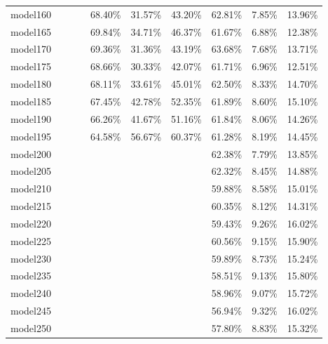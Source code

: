 \begin{longtable}{@{}llllllllll@{}}
model160 &         &         &         & 68.40\%  & 31.57\% & 43.20\% & 62.81\%  & 7.85\%  & 13.96\% \\
model165 &         &         &         & 69.84\%  & 34.71\% & 46.37\% & 61.67\%  & 6.88\%  & 12.38\% \\
model170 &         &         &         & 69.36\%  & 31.36\% & 43.19\% & 63.68\%  & 7.68\%  & 13.71\% \\
model175 &         &         &         & 68.66\%  & 30.33\% & 42.07\% & 61.71\%  & 6.96\%  & 12.51\% \\
model180 &         &         &         & 68.11\%  & 33.61\% & 45.01\% & 62.50\%  & 8.33\%  & 14.70\% \\
model185 &         &         &         & 67.45\%  & 42.78\% & 52.35\% & 61.89\%  & 8.60\%  & 15.10\% \\
model190 &         &         &         & 66.26\%  & 41.67\% & 51.16\% & 61.84\%  & 8.06\%  & 14.26\% \\
model195 &         &         &         & 64.58\%  & 56.67\% & 60.37\% & 61.28\%  & 8.19\%  & 14.45\% \\
model200 &         &         &         &          &         &         & 62.38\%  & 7.79\%  & 13.85\% \\
model205 &         &         &         &          &         &         & 62.32\%  & 8.45\%  & 14.88\% \\
model210 &         &         &         &          &         &         & 59.88\%  & 8.58\%  & 15.01\% \\
model215 &         &         &         &          &         &         & 60.35\%  & 8.12\%  & 14.31\% \\
model220 &         &         &         &          &         &         & 59.43\%  & 9.26\%  & 16.02\% \\
model225 &         &         &         &          &         &         & 60.56\%  & 9.15\%  & 15.90\% \\
model230 &         &         &         &          &         &         & 59.89\%  & 8.73\%  & 15.24\% \\
model235 &         &         &         &          &         &         & 58.51\%  & 9.13\%  & 15.80\% \\
model240 &         &         &         &          &         &         & 58.96\%  & 9.07\%  & 15.72\% \\
model245 &         &         &         &          &         &         & 56.94\%  & 9.32\%  & 16.02\% \\
model250 &         &         &         &          &         &         & 57.80\%  & 8.83\%  & 15.32\% \\

\end{longtable}
